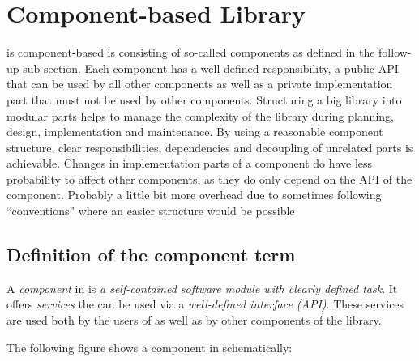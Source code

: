 
\section{Component-based Library}
\label{sec:KomponentenbasierteLibrary}

{%
\LibName{} is component-based
}
{%
\LibName{} is consisting of so-called components as defined in the follow-up sub-section. Each component has a well defined responsibility, a public API that can be used by all other components as well as a private implementation part that must not be used by other components. 
}
{%
Structuring a big library into modular parts helps to manage the complexity of the library during planning, design, implementation and maintenance. By using a reasonable component structure, clear responsibilities, dependencies and decoupling of unrelated parts is achievable. Changes in implementation parts of a component do have less probability to affect other components, as they do only depend on the API of the component.
}
{%
Probably a little bit more overhead due to sometimes following ``conventions'' where an easier structure would be possible
}


\subsection{Definition of the component term}
\label{sec:ComponentTermDefinition}

A \emph{component} in \LibName{} is \emph{a self-contained software module with clearly defined task}. It offers \emph{services} the can be used via a \emph{well-defined interface (API)}. These services are used both by the users of \LibName{} as well as by other components of the library. 

The following figure shows a component in \LibName{} schematically:

